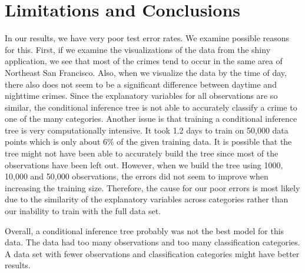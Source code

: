 \documentclass[11pt]{article}
\begin{document}
\section*{Limitations and Conclusions}

In our results, we have very poor test error rates. We examine possible reasons for this. First, if we examine the visualizations of the data from the shiny application, we see that most of the crimes tend to occur in the same area of Northeast San Francisco. Also, when we visualize the data by the time of day, there also does not seem to be a  significant difference between daytime and nighttime crimes. Since the explanatory variables for all observations are so similar, the conditional inference tree is not able to accurately classify a crime to one of the many categories. Another issue is that training a conditional inference tree is very computationally intensive. It took 1.2 days to train on 50,000 data points which is only about 6\% of the given training data. It is possible that the tree might not have been able to accurately build the tree since most of the observations have been left out. However, when we build the tree using 1000, 10,000 and 50,000 observations, the errors did not seem to improve when increasing the training size. Therefore, the cause for our poor errors is most likely due to the similarity of the explanatory variables across categories rather than our inability to train with the full data set. 

Overall, a conditional inference tree probably was not the best model for this data. The data had too many observations and too many classification categories. A data set with fewer observations and classification categories might have better results. 
\end{document}

